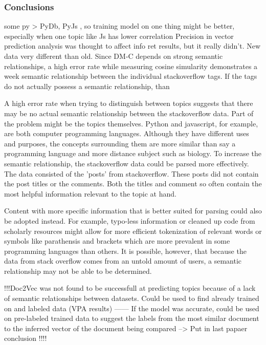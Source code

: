 


\subsubsection{Conclusions}

some py > PyDb, PyJs , so training model on one thing might be better, especially when one topic like Js has lower correlation
Precision in vector prediction analysis was thought to affect info ret results, but it really didn't. New data very different than old.
Since DM-C depends on strong semantic relationships, a high error rate while measuring cosine simularity demonstrates a week semantic relationship between the individual stackoverflow tags. If the tags do not actually possess a semantic relationship, than 

A high error rate when trying to distinguish between topics suggests that there may be no actual semantic relationship between the stackoverflow data. Part of the problem might be the topics themselves. Python and javascript, for example, are both computer programming languages. Although they have different uses and purposes, the concepts surrounding them are more similar than say a programming language and more distance subject such as biology. To increase the semantic relationship, the stackoverflow data could be parsed more effectively. The data consisted of the 'posts' from stackoverflow. These posts did not contain the post titles or the comments. Both the titles and comment so often contain the most helpful information relevant to the topic at hand. 

Content with more specific information that is better suited for parsing could also be adopted instead. For example, typo-less information or cleaned up code from scholarly resources might allow for more efficient tokenization of relevant words or symbols like parathensis and brackets which are more prevalent in some programming languages than others. It is possible, however, that because the data from stack overflow comes from an untold amount of users, a semantic relationship may not be able to be determined. 

!!!Doc2Vec was not found to be successfull at predicting topics because of a lack of semantic relationships between datasets. Could be used to find already trained on and labeled data (VPA results) ------ If the model was accurate, could be used on pre-labeled trained data to suggest the labels from the most similar document to the inferred vector of the document being compared  --> Put in last papaer conclusion !!!!

